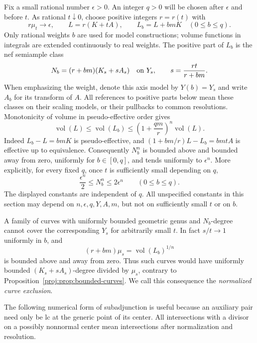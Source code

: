 \documentclass[11pt,letterpaper]{article}
\DeclareMathOperator{\vol}{vol}
\theoremstyle{definition}
\theoremstyle{remark}
\begin{document}
Fix a small rational number \(\epsilon>0\).  An integer \(q>0\) will
be chosen after \(\epsilon\) and before \(t\).  As rational \(t\downarrow0\),
choose positive integers \(r=r(t)\) with
\begin{equation}\label{proj:jet:normalization}
 r\mu_t\longrightarrow\epsilon,\qquad
 L=r(K+tA),\qquad L_b=L+bmK\quad(0\le b\le q).
\end{equation}
Only rational weights \(b\) are used for model constructions;
volume functions in integrals are extended continuously to real weights.
The positive part of \(L_b\) is
the nef semiample class
\[
 N_b=(r+bm)(K_s+sA_s)
 \quad\hbox{on }Y_s,\qquad s=\frac{rt}{r+bm}.
\]
When emphasizing the weight, denote this axis model by \(Y(b)=Y_s\)
and write \(A_b\) for its transform of \(A\).
All references to positive parts below mean these classes on their
scaling models, or their pullbacks to common resolutions.  Monotonicity
of volume in pseudo-effective order gives
\begin{equation}\label{proj:jet:volume-comparison}
 \vol(L)\le \vol(L_b)\le
 \left(1+\frac{qm}{r}\right)^n\vol(L).
\end{equation}
Indeed \(L_b-L=bmK\) is pseudo-effective, and
\((1+bm/r)L-L_b=bmtA\) is effective up to equivalence.
Consequently \(N_b^n\) is bounded above and bounded away from zero,
uniformly for \(b\in[0,q]\), and tends uniformly to \(\epsilon^n\).
More explicitly, for every fixed \(q\), once \(t\) is sufficiently
small depending on \(q\),
\begin{equation}\label{proj:jet:uniform-normalized-volume}
 \frac{\epsilon^n}{2}\le N_b^n\le2\epsilon^n
 \qquad(0\le b\le q).
\end{equation}
The displayed constants are independent of \(q\).
All unspecified constants in this section may depend on
\(n,\epsilon,q,Y,A,m\), but not on sufficiently small \(t\) or on \(b\).

A family of curves with uniformly bounded geometric genus and
\(N_b\)-degree cannot cover the corresponding \(Y_s\) for arbitrarily
small \(t\).  In fact \(s/t\to1\) uniformly in \(b\), and
\[
 (r+bm)\mu_s=\vol(L_b)^{1/n}
\]
is bounded above and away from zero.  Thus such curves would have
uniformly bounded \((K_s+sA_s)\)-degree divided by \(\mu_s\), contrary
to Proposition~\ref{proj:prop:bounded-curves}.  We call this consequence the
\emph{normalized curve exclusion}.

The following numerical form of subadjunction is useful because an
auxiliary pair need only be lc at the generic point of its center.
All intersections with a divisor on a possibly nonnormal center mean
intersections after normalization and resolution.
\end{document}
